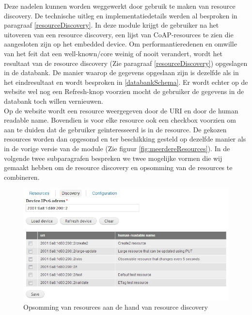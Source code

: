 Deze nadelen kunnen worden weggewerkt door gebruik te maken van resource discovery. De technische uitleg en implementatiedetails werden al besproken in paragraaf \ref{resourceDiscovery}. In deze module krijgt de gebruiker na het uitoveren van een resource discovery, een lijst van CoAP-resources te zien die aangesloten zijn op het embedded device. Om performantieredenen en omwille van het feit dat een well-known/core weinig of nooit verandert, wordt het resultaat van de resource discovery (Zie paragraaf \ref{resourceDiscovery}) opgeslagen in de databank. De manier waarop de gegevens opgeslaan zijn is dezelfde als in het eindresultaat en wordt besproken in \ref{databankSchema}. Er wordt echter op de website wel nog een Refresh-knop voorzien mocht de gebruiker de gegevens in de databank toch willen vernieuwen.\\
Op de website wordt een resource weergegeven door de URI en door de human readable name. Bovendien is voor elke resource ook een checkbox voorzien om aan te duiden dat de gebruiker ge\"{i}nteresseerd is in de resource. De gekozen resources worden dan opgesomd en ter beschikking gesteld op dezelfde manier als in de vorige versie van de module (Zie figuur \ref{fig:meerdereResources}). In de volgende twee subparagrafen bespreken we twee mogelijke vormen die wij gemaakt hebben om de resource discovery en opsomming van de resources te combineren.

\begin{figure}[h!]
\centering
\includegraphics[width=1\textwidth]{fig/tabbladen}
\caption{Opsomming van resources aan de hand van resource discovery}
\label{fig:tabbladen}
\end{figure}


